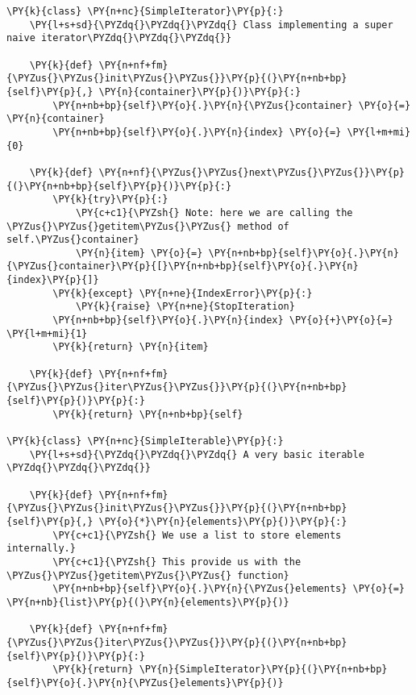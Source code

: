 \begin{Verbatim}[label=\makebox{\url{https://github.com/lucabaldini/cmepda/tree/master/slides/latex/snippets/simple\_iterator.py}},commandchars=\\\{\}]
\PY{k}{class} \PY{n+nc}{SimpleIterator}\PY{p}{:}
    \PY{l+s+sd}{\PYZdq{}\PYZdq{}\PYZdq{} Class implementing a super naive iterator\PYZdq{}\PYZdq{}\PYZdq{}}
    
    \PY{k}{def} \PY{n+nf+fm}{\PYZus{}\PYZus{}init\PYZus{}\PYZus{}}\PY{p}{(}\PY{n+nb+bp}{self}\PY{p}{,} \PY{n}{container}\PY{p}{)}\PY{p}{:}
        \PY{n+nb+bp}{self}\PY{o}{.}\PY{n}{\PYZus{}container} \PY{o}{=} \PY{n}{container}
        \PY{n+nb+bp}{self}\PY{o}{.}\PY{n}{index} \PY{o}{=} \PY{l+m+mi}{0}
    
    \PY{k}{def} \PY{n+nf}{\PYZus{}\PYZus{}next\PYZus{}\PYZus{}}\PY{p}{(}\PY{n+nb+bp}{self}\PY{p}{)}\PY{p}{:}
        \PY{k}{try}\PY{p}{:}
            \PY{c+c1}{\PYZsh{} Note: here we are calling the \PYZus{}\PYZus{}getitem\PYZus{}\PYZus{} method of self.\PYZus{}container}
            \PY{n}{item} \PY{o}{=} \PY{n+nb+bp}{self}\PY{o}{.}\PY{n}{\PYZus{}container}\PY{p}{[}\PY{n+nb+bp}{self}\PY{o}{.}\PY{n}{index}\PY{p}{]}
        \PY{k}{except} \PY{n+ne}{IndexError}\PY{p}{:}
            \PY{k}{raise} \PY{n+ne}{StopIteration}
        \PY{n+nb+bp}{self}\PY{o}{.}\PY{n}{index} \PY{o}{+}\PY{o}{=} \PY{l+m+mi}{1}
        \PY{k}{return} \PY{n}{item}
    
    \PY{k}{def} \PY{n+nf+fm}{\PYZus{}\PYZus{}iter\PYZus{}\PYZus{}}\PY{p}{(}\PY{n+nb+bp}{self}\PY{p}{)}\PY{p}{:}
        \PY{k}{return} \PY{n+nb+bp}{self}
        
\PY{k}{class} \PY{n+nc}{SimpleIterable}\PY{p}{:}
    \PY{l+s+sd}{\PYZdq{}\PYZdq{}\PYZdq{} A very basic iterable \PYZdq{}\PYZdq{}\PYZdq{}}
    
    \PY{k}{def} \PY{n+nf+fm}{\PYZus{}\PYZus{}init\PYZus{}\PYZus{}}\PY{p}{(}\PY{n+nb+bp}{self}\PY{p}{,} \PY{o}{*}\PY{n}{elements}\PY{p}{)}\PY{p}{:}
        \PY{c+c1}{\PYZsh{} We use a list to store elements internally.}
        \PY{c+c1}{\PYZsh{} This provide us with the \PYZus{}\PYZus{}getitem\PYZus{}\PYZus{} function}
        \PY{n+nb+bp}{self}\PY{o}{.}\PY{n}{\PYZus{}elements} \PY{o}{=} \PY{n+nb}{list}\PY{p}{(}\PY{n}{elements}\PY{p}{)}
    
    \PY{k}{def} \PY{n+nf+fm}{\PYZus{}\PYZus{}iter\PYZus{}\PYZus{}}\PY{p}{(}\PY{n+nb+bp}{self}\PY{p}{)}\PY{p}{:}
        \PY{k}{return} \PY{n}{SimpleIterator}\PY{p}{(}\PY{n+nb+bp}{self}\PY{o}{.}\PY{n}{\PYZus{}elements}\PY{p}{)}
\end{Verbatim}